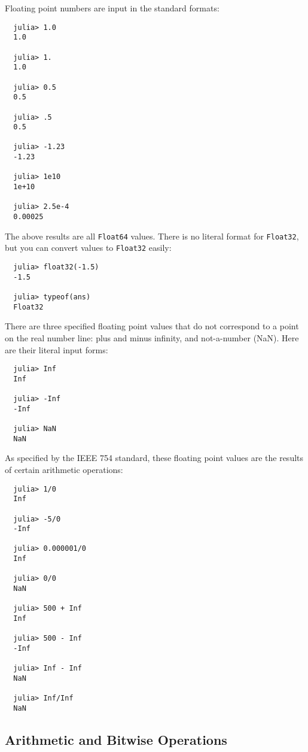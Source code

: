 \documentclass{article}
\begin{document}
Floating point numbers are input in the standard formats:
\begin{verbatim}
  julia> 1.0
  1.0

  julia> 1.
  1.0

  julia> 0.5
  0.5

  julia> .5
  0.5

  julia> -1.23
  -1.23

  julia> 1e10
  1e+10

  julia> 2.5e-4
  0.00025
\end{verbatim}
The above results are all \verb|Float64| values. There is no literal format for \verb|Float32|, but you can convert values to \verb|Float32| easily:
\begin{verbatim}
  julia> float32(-1.5)
  -1.5

  julia> typeof(ans)
  Float32
\end{verbatim}
There are three specified floating point values that do not correspond to a point on the real number line: plus and minus infinity, and not-a-number (NaN).
Here are their literal input forms:
\begin{verbatim}
  julia> Inf
  Inf

  julia> -Inf
  -Inf

  julia> NaN
  NaN
\end{verbatim}
As specified by the IEEE 754 standard, these floating point values are the results of certain arithmetic operations:
\begin{verbatim}
  julia> 1/0
  Inf

  julia> -5/0
  -Inf

  julia> 0.000001/0
  Inf

  julia> 0/0
  NaN

  julia> 500 + Inf
  Inf

  julia> 500 - Inf
  -Inf

  julia> Inf - Inf
  NaN

  julia> Inf/Inf
  NaN
\end{verbatim}

\subsection{Arithmetic and Bitwise Operations}
\end{document}
